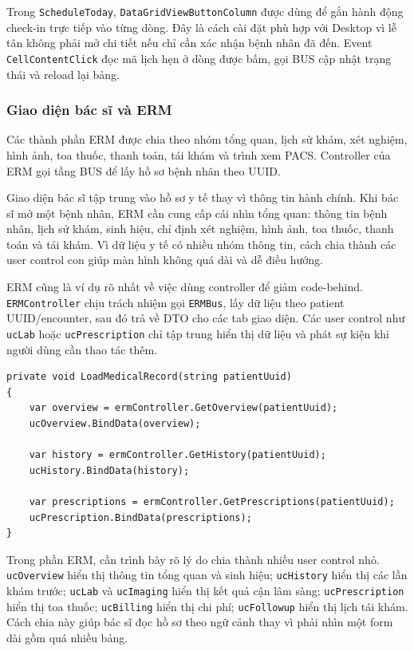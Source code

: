 \documentclass[12pt,a4paper]{article}
\numberwithin{figure}{subsection}
\numberwithin{table}{subsection}
\newcounter{codecounter}
\newenvironment{codeblock}[2]{%
    \refstepcounter{codecounter}%
    \phantomsection%
    \label{#1}%
    \par\smallskip
}{%
    \par\smallskip
}
\begin{document}
Trong \texttt{ScheduleToday}, \texttt{DataGridViewButtonColumn} được dùng để gắn hành động check-in trực tiếp vào từng dòng. Đây là cách cài đặt phù hợp với Desktop vì lễ tân không phải mở chi tiết nếu chỉ cần xác nhận bệnh nhân đã đến. Event \texttt{CellContentClick} đọc mã lịch hẹn ở dòng được bấm, gọi BUS cập nhật trạng thái và reload lại bảng.

\subsubsection{Giao diện bác sĩ và ERM}

Các thành phần ERM được chia theo nhóm tổng quan, lịch sử khám, xét nghiệm, hình ảnh, toa thuốc, thanh toán, tái khám và trình xem PACS. Controller của ERM gọi tầng BUS để lấy hồ sơ bệnh nhân theo UUID.

Giao diện bác sĩ tập trung vào hồ sơ y tế thay vì thông tin hành chính. Khi bác sĩ mở một bệnh nhân, ERM cần cung cấp cái nhìn tổng quan: thông tin bệnh nhân, lịch sử khám, sinh hiệu, chỉ định xét nghiệm, hình ảnh, toa thuốc, thanh toán và tái khám. Vì dữ liệu y tế có nhiều nhóm thông tin, cách chia thành các user control con giúp màn hình không quá dài và dễ điều hướng.

ERM cũng là ví dụ rõ nhất về việc dùng controller để giảm code-behind. \texttt{ERMController} chịu trách nhiệm gọi \texttt{ERMBus}, lấy dữ liệu theo patient UUID/encounter, sau đó trả về DTO cho các tab giao diện. Các user control như \texttt{ucLab} hoặc \texttt{ucPrescription} chỉ tập trung hiển thị dữ liệu và phát sự kiện khi người dùng cần thao tác thêm.

\begin{codeblock}{code:erm-load}{Nạp hồ sơ bệnh án theo bệnh nhân}
\begin{verbatim}
private void LoadMedicalRecord(string patientUuid)
{
    var overview = ermController.GetOverview(patientUuid);
    ucOverview.BindData(overview);

    var history = ermController.GetHistory(patientUuid);
    ucHistory.BindData(history);

    var prescriptions = ermController.GetPrescriptions(patientUuid);
    ucPrescription.BindData(prescriptions);
}
\end{verbatim}
\end{codeblock}

Trong phần ERM, cần trình bày rõ lý do chia thành nhiều user control nhỏ. \texttt{ucOverview} hiển thị thông tin tổng quan và sinh hiệu; \texttt{ucHistory} hiển thị các lần khám trước; \texttt{ucLab} và \texttt{ucImaging} hiển thị kết quả cận lâm sàng; \texttt{ucPrescription} hiển thị toa thuốc; \texttt{ucBilling} hiển thị chi phí; \texttt{ucFollowup} hiển thị lịch tái khám. Cách chia này giúp bác sĩ đọc hồ sơ theo ngữ cảnh thay vì phải nhìn một form dài gồm quá nhiều bảng.
\end{document}
